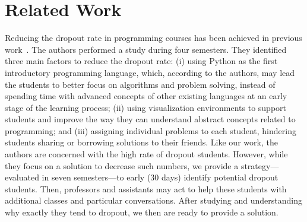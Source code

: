 \section{Related Work}

Reducing the dropout rate in programming courses has been achieved in previous work~\cite{}. The authors performed a study during four semesters. They identified three main factors to reduce the dropout rate: (i) using Python as the first introductory programming language, which, according to the authors, may lead the students to better focus on algorithms and problem solving, instead of spending time with advanced concepts of other existing languages at an early stage of the learning process; (ii) using visualization environments to support students and improve the way they can understand abstract concepts related to programming; and (iii) assigning individual problems to each student, hindering students sharing or borrowing solutions to their friends. Like our work, the authors are concerned with the high rate of dropout students. However, while they focus on a solution to decrease such numbers, we provide a strategy---evaluated in seven semesters---to early (30 days) identify potential dropout students. Then, professors and assistants may act to help these students with additional classes and particular conversations. After studying and understanding why exactly they tend to dropout, we then are ready to provide a solution. 
